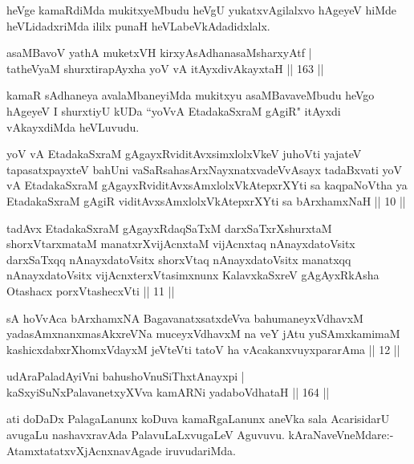 \begin{artha}%
heVge kamaRdiMda mukitxyeMbudu heVgU yukatxvAgilalxvo hAgeyeV hiMde heVLidadxriMda ililx punaH heVLabeVkAdadidxlalx.
\end{artha}

\begin{shl}
asaMBavoV yathA muketxVH kirxyAsAdhanasaMsharxyAtf |\\
tatheVyaM shurxtirapAyxha yoV vA itAyxdivAkayxtaH \hfill || 163 ||
\end{shl}

\begin{artha}
kamaR sAdhaneya avalaMbaneyiMda mukitxyu asaMBavaveMbudu heVgo hAgeyeV I shurxtiyU kUDa ``yoVvA EtadakaSxraM gAgiR" itAyxdi vAkayxdiMda heVLuvudu.
\end{artha}



\begin{kandikeshl}
yoV vA EtadakaSxraM gAgayxRviditAvxsimxlolxVkeV juhoVti yajateV tapasatxpayxteV bahUni vaSaRsahasArxNayxnatxvadeVvAsayx tadaBxvati yoV vA EtadakaSxraM gAgayxRviditAvxsAmxlolxVkAtepxrXYti sa kaqpaNoV\s tha ya EtadakaSxraM gAgiR viditAvxsAmxlolxVkAtepxrXYti sa bArxhamxNaH || 10 ||

tadAvx EtadakaSxraM gAgayxRdaqSaTxM darxSaTxrXshurxtaM shorxVtarxmataM manatxrXvijAcnxtaM vijAcnxtaq nAnayxdatoV\s sitx darxSaTxqq nAnayxdatoV\s sitx shorxVtaq nAnayxdatoV\s sitx manatxqq nAnayxdatoV\s sitx vijAcnxterxVtasimxnunx KalavxkaSxreV gAgAyxRkAsha Otashacx porxVtashecxVti || 11 ||

sA hoVvAca bArxhamxNA BagavanatxsatxdeVva bahumaneyxVdhavxM yadasAmxnanxmasAkxreVNa muceyxVdhavxM na veY jAtu yuSAmxkamimaM kashicxdabxrXhomxVdayxM jeVteVti tatoV ha vAcakanxvuyxpararAma || 12 ||
\end{kandikeshl}


\begin{shl}
udAraPaladAyiVni bahushoV\s nuSiThxtAnayxpi |\\
kaSxyiSuNxPalavanetxyXVva kamARNi yadaboVdhataH \hfill || 164 ||
\end{shl}

\begin{artha}
ati doDaDx PalagaLanunx koDuva kamaRgaLanunx aneVka sala AcarisidarU avugaLu nashavxravAda PalavuLaLxvugaLeV Aguvuvu. kAraNaveVneMdare:- AtamxtatatxvXjAcnxnavAgade iruvudariMda.
\end{artha}

